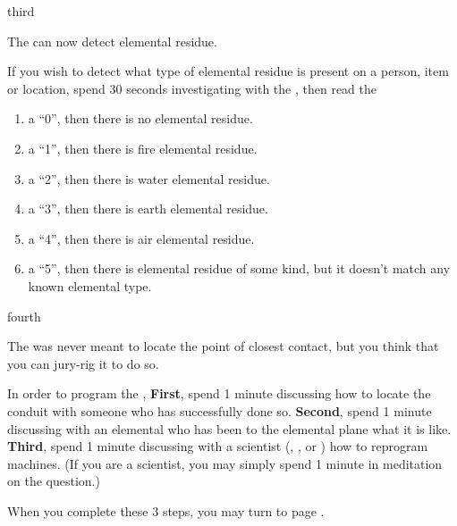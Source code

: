 \documentclass[notebook]{elementals}
\begin{document}
\begin{page}{third}

The \iTricorder{} can now detect elemental residue.

If you wish to detect what type of elemental residue is present on a person, item or location, spend 30 seconds investigating with the \iTricorder{}, then read the %

\begin{enumerate}
  \item a ``0'', then there is no elemental residue.
  \item a ``1'', then there is fire elemental residue.
  \item a ``2'', then there is water elemental residue.
  \item a ``3'', then there is earth elemental residue.
  \item a ``4'', then there is air elemental residue.
  \item a ``5'', then there is elemental residue of some kind, but it doesn't match any known elemental type.
\end{enumerate}

\end{page}

\begin{page}{fourth}

The \iTricorder{} was never meant to locate the point of closest contact, but you think that you can jury-rig it to do so.

In order to program the \iTricorder{}, {\bf First}, spend 1 minute discussing how to locate the conduit with someone who has successfully done so. {\bf Second}, spend 1 minute discussing with an elemental who has been to the elemental plane what it is like. {\bf Third}, spend 1 minute discussing with a scientist (\cGD{}, \cScientist{}, or \cMS{}) how to reprogram machines. (If you are a scientist, you may simply spend 1 minute in meditation on the question.)

When you complete these 3 steps, you may turn to page .

\end{page}
\end{document}
